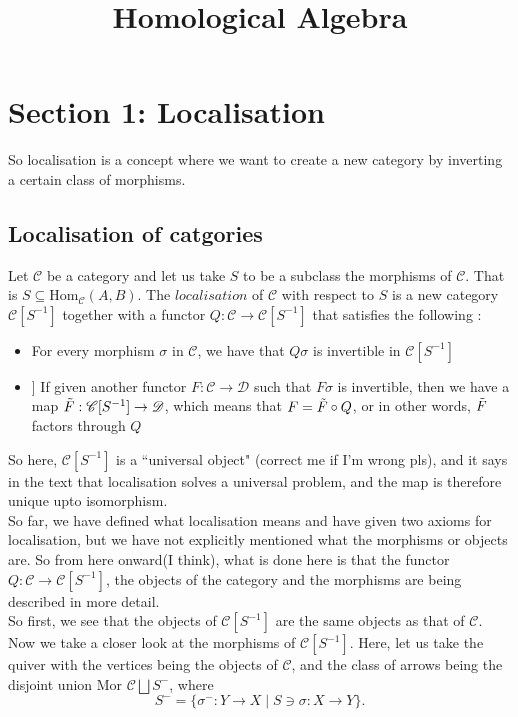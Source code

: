 \documentclass[12pt]{article}
\title{Homological Algebra}
\newcommand{\cat}[1]{\mathscr{#1}}
\begin{document}
\maketitle
\section*{Section 1: Localisation}
 So localisation is a concept where we want to create a new category by inverting a certain class of morphisms.
 \subsection{Localisation of catgories}
 Let $\cat{C}$ be a category and let us take $S$ to be a subclass the morphisms of $\cat{C}$. That is $S\subseteq \text{Hom}_\cat{C}(A,B)$. The $\textit{localisation}$ of $\cat{C}$ with respect to $S$ is a new category $\cat{C}[S^{-1}]$ together with a functor $Q: \cat{C} \to \cat{C}[S^{-1}]$ that satisfies the following :

 \begin{itemize}
     \item[[L1] For every morphism $\sigma$ in $\cat{C}$, we have that $Q\sigma$ is invertible in $\cat{C}[S^{-1}]$
     \item[[L2]] If given another functor $F: \cat{C} \to \cat{D}$ such that $F\sigma$ is invertible, then we have a map $\Tilde{F}: \cat{C}[S^{-1}] \to \cat{D}$, which means that $F=\Tilde{F} \circ Q$, or in other words, $\Tilde{F}$ factors through $Q$
 \end{itemize}

 So here, $\cat{C}[S^{-1}]$ is a ``universal object" (correct me if I'm wrong pls), and it says in the text that localisation solves a universal problem, and the map is therefore unique upto isomorphism.\\

 So far, we have defined what localisation means and have given two axioms for localisation, but we have not explicitly mentioned what the morphisms or objects are. So from here onward(I think), what is done here is that the functor $Q: \cat{C} \to \cat{C}[S^{-1}]$, the objects of the category and the morphisms are being described in more detail.\\

 So first, we see that the objects of  $\cat{C}[S^{-1}]$ are the same objects as that of $\cat{C}$. Now we take a closer look at the morphisms of $\cat{C}[S^{-1}]$. Here, let us take the quiver with the vertices being the objects of $\cat{C}$,  and the class of arrows being the disjoint union Mor $\cat{C} \bigsqcup S^{-} $, where 
 \[
 S^{-}= \{\sigma^-:Y \to X \mid S \ni \sigma:X \to Y\}.
 \]
\end{document}
